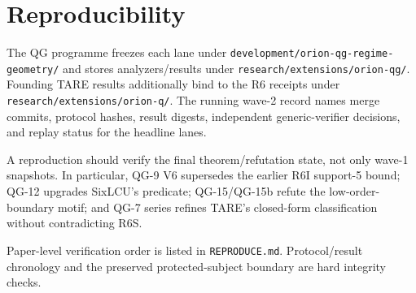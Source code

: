 \section{Reproducibility}

The QG programme freezes each lane under \texttt{development/orion-qg-regime-geometry/} and stores analyzers/results under \texttt{research/extensions/orion-qg/}. Founding TARE results additionally bind to the R6 receipts under \texttt{research/extensions/orion-q/}. The running wave-2 record names merge commits, protocol hashes, result digests, independent generic-verifier decisions, and replay status for the headline lanes.

A reproduction should verify the final theorem/refutation state, not only wave-1 snapshots. In particular, QG-9 V6 supersedes the earlier R6I support-5 bound; QG-12 upgrades SixLCU's predicate; QG-15/QG-15b refute the low-order-boundary motif; and QG-7 series refines TARE's closed-form classification without contradicting R6S.

Paper-level verification order is listed in \texttt{REPRODUCE.md}. Protocol/result chronology and the preserved protected-subject boundary are hard integrity checks.